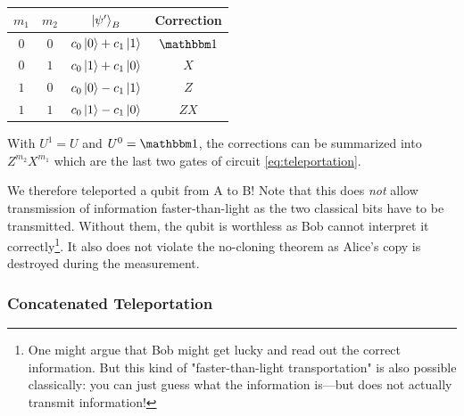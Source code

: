 			\begin{center}
				\centering
				\begin{tabular}{cc|c|c}
					\(m_1\) & \(m_2\) &        \(\ket{\psi'}_B\)        & Correction \\ \midrule
					 \(0\)  &  \(0\)  & \( c_0 \ket{0} + c_1 \ket{1} \) &  \(\ID\)   \\
					 \(0\)  &  \(1\)  & \( c_0 \ket{1} + c_1 \ket{0} \) &   \(X\)    \\
					 \(1\)  &  \(0\)  & \( c_0 \ket{0} - c_1 \ket{1} \) &   \(Z\)    \\
					 \(1\)  &  \(1\)  & \( c_0 \ket{1} - c_1 \ket{0} \) &   \(ZX\)
				\end{tabular}
			\end{center}
			With \( U^1 = U \) and \( U^0 = \ID \), the corrections can be summarized into \( Z^{m_2} X^{m_1} \) which are the last two gates of circuit \eqref{eq:teleportation}.

			We therefore teleported a qubit from A to B! Note that this does \emph{not} allow transmission of information faster-than-light as the two classical bits have to be transmitted. Without them, the qubit is worthless as Bob cannot interpret it correctly\footnote{One might argue that Bob might get lucky and read out the correct information. But this kind of "faster-than-light transportation" is also possible classically: you can just guess what the information is---but does not actually transmit information!}. It also does not violate the no-cloning theorem as Alice's copy is destroyed during the measurement.

			\subsubsection{Concatenated Teleportation}

